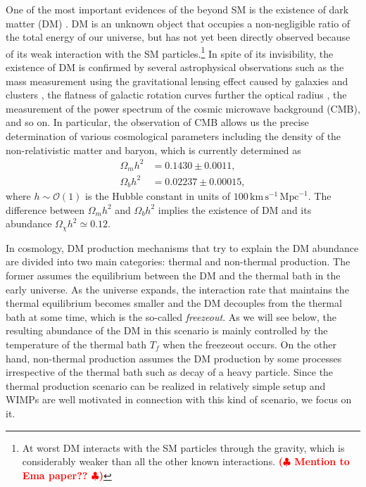 \documentclass[12pt,twoside,book]{article}
\def\rem#1{ {\bf\textcolor{red}{($\clubsuit$ #1 $\clubsuit$)}}}
\begin{document}
One of the most important evidences of the beyond SM is the existence
of dark matter (DM) \cite{Zwicky:1933}.  DM is an unknown object that
occupies a non-negligible ratio of the total energy of our universe,
but has not yet been directly observed because of its weak interaction
with the SM particles.\footnote{
At worst DM interacts with the SM particles through the gravity, which
is considerably weaker than all the other known interactions.
\rem{Mention to Ema paper??}
}
In spite of its invisibility, the existence of DM is confirmed by
several astrophysical observations such as the mass measurement using
the gravitational lensing effect caused by galaxies and clusters
\cite{Zwicky:1937, Trimble:1987ee}, the flatness of galactic rotation
curves further the optical radius \cite{1939LicOB..19...41B,
Begeman:1991iy}, the measurement of the power spectrum of the cosmic
microwave background (CMB), and so on.  In particular, the observation
of CMB allows us the precise determination of various cosmological
parameters \cite{Jungman:1995av, Jungman:1995bz} including the density
of the non-relativistic matter and baryon, which is currently
determined as \cite{Aghanim:2018eyx}
\begin{align}
 \Omega_m h^2 &= 0.1430 \pm 0.0011,\\
 \Omega_b h^2 &= 0.02237 \pm 0.00015,
\end{align}
where $h \sim \mathcal{O}(1)$ is the Hubble constant in units of
$100\, \mathrm{km}\, \mathrm{s}^{-1}\, \mathrm{Mpc}^{-1}$.  The
difference between $\Omega_m h^2$ and $\Omega_b h^2$ implies the
existence of DM and its abundance $\Omega_\chi h^2 \simeq 0.12$.

In cosmology, DM production mechanisms that try to explain the DM
abundance are divided into two main categories: thermal and
non-thermal production.  The former assumes the equilibrium between
the DM and the thermal bath in the early universe.  As the universe
expands, the interaction rate that maintains the thermal equilibrium
becomes smaller and the DM decouples from the thermal bath at some
time, which is the so-called \textit{freezeout}.  As we will see
below, the resulting abundance of the DM in this scenario is mainly
controlled by the temperature of the thermal bath $T_f$ when the
freezeout occurs.  On the other hand, non-thermal production assumes
the DM production by some processes irrespective of the thermal bath
such as decay of a heavy particle.  Since the thermal production
scenario can be realized in relatively simple setup and WIMPs are well
motivated in connection with this kind of scenario, we focus on it.
\end{document}
